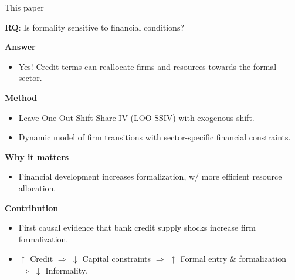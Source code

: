 \documentclass[aspectratio=169]{beamer}
\begin{document}


\begin{frame}{This paper} \label{this_paper}

\begin{center}
    \Large \textbf{RQ}: Is formality sensitive to financial conditions?
\end{center}

\vspace{2mm}
\pause

\textbf{Answer}
\begin{itemize}
    \item Yes! Credit terms can reallocate firms and resources towards the formal sector.
\end{itemize}

\vspace{1mm}
\pause

\textbf{Method}
\begin{itemize}
    \item Leave-One-Out Shift-Share IV (LOO-SSIV) with exogenous shift.
    \item Dynamic model of firm transitions with sector-specific financial constraints.
\end{itemize}

\vspace{1mm}
\pause

\textbf{Why it matters}
\begin{itemize}
    \item Financial development increases formalization, w/ more efficient resource allocation.
\end{itemize}

\vspace{1mm}
\pause

\textbf{Contribution}
\begin{itemize}
    \item First causal evidence that bank credit supply shocks increase firm formalization.
    \item $\uparrow$ Credit $\Rightarrow$ $\downarrow$ Capital constraints $\Rightarrow$ $\uparrow$ Formal entry \& formalization $\Rightarrow$ $\downarrow$ Informality.
\end{itemize}

\end{frame}

\end{document}
